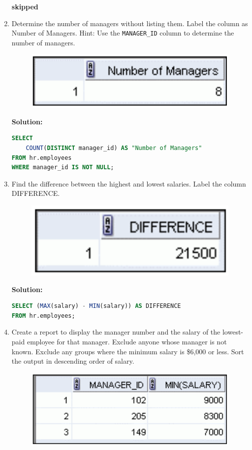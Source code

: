 \documentclass[a4paper,12pt]{article}
\begin{document}
\begin{enumerate}
    \textbf{skipped}
        \item Determine the number of managers without listing them. Label the column as Number of
Managers. Hint: Use the \texttt{MANAGER\_ID} column to determine the number of managers.
    \begin{figure}[h]
        \centering
        \includegraphics[width=.4\linewidth]{graphics/67.png}
    \end{figure}

    \textbf{Solution: }
    \begin{lstlisting}[language=SQL]
SELECT 
    COUNT(DISTINCT manager_id) AS "Number of Managers"
FROM hr.employees
WHERE manager_id IS NOT NULL;
    \end{lstlisting}
        \item Find the difference between the highest and lowest salaries. Label the column DIFFERENCE.
    \begin{figure}[h]
        \centering
        \includegraphics[width=.35\linewidth]{graphics/68.png}
    \end{figure}

    \textbf{Solution: }
    \begin{lstlisting}[language=SQL]
SELECT (MAX(salary) - MIN(salary)) AS DIFFERENCE
FROM hr.employees;
    \end{lstlisting}
        \item Create a report to display the manager number and the salary of the lowest-paid employee for
that manager. Exclude anyone whose manager is not known. Exclude any groups where the
minimum salary is \$6,000 or less. Sort the output in descending order of salary.
    \begin{figure}[h]
        \centering
        \includegraphics[width=.4\linewidth]{graphics/69.png}
    \end{figure}


\end{enumerate}
\end{document}
